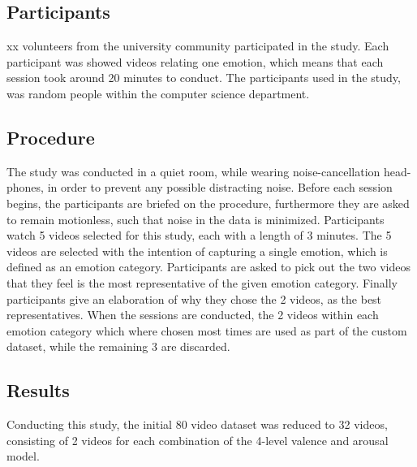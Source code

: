 \subsection{Participants}
xx volunteers from the university community participated in the study. Each participant was showed videos relating one emotion, which means that each session took around 20 minutes to conduct. The participants used in the study, was random people within the computer science department.

\subsection{Procedure}
The study was conducted in a quiet room, while wearing noise-cancellation head-phones, in order to prevent any possible distracting noise. 
Before each session begins, the participants are briefed on the procedure, furthermore they are asked to remain motionless, such that noise in the data is minimized.
Participants watch 5 videos selected for this study, each with a length of 3 minutes. The 5 videos are selected with the intention of capturing a single emotion, which is defined as an emotion category. Participants are asked to pick out the two videos that they feel is the most representative of the given emotion category. Finally participants give an elaboration of why they chose the 2 videos, as the best representatives.
When the sessions are conducted, the 2 videos within each emotion category which where chosen most times are used as part of the custom dataset, while the remaining 3 are discarded.

\subsection{Results}
Conducting this study, the initial 80 video dataset was reduced to 32 videos, consisting of 2 videos for each combination of the 4-level valence and arousal model.